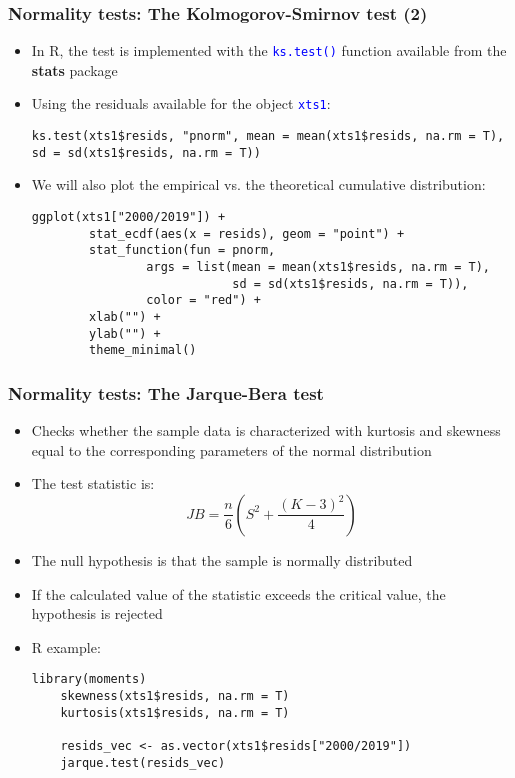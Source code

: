 \documentclass[10pt]{beamer}
\newcommand{\cc}[1]{\texttt{\textcolor{blue}{#1}}}
\theoremstyle{definition}
\begin{document}
\begin{frame}[fragile]
\frametitle{Normality tests: The Kolmogorov-Smirnov test (2)}
\begin{itemize}
	\item In R, the test is implemented with the \cc{ks.test()} function available from the \textbf{stats} package
	\item Using the residuals available for the object \cc{xts1}:
	\begin{lstlisting}[style = rstyle, breaklines]
	ks.test(xts1$resids, "pnorm", mean = mean(xts1$resids, na.rm = T), sd = sd(xts1$resids, na.rm = T))	
	\end{lstlisting}
	\item We will also plot the empirical vs. the theoretical cumulative distribution:
	\begin{lstlisting}[style = rstyle, breaklines]
	ggplot(xts1["2000/2019"]) + 
		stat_ecdf(aes(x = resids), geom = "point") + 
		stat_function(fun = pnorm, 
                args = list(mean = mean(xts1$resids, na.rm = T), 
                            sd = sd(xts1$resids, na.rm = T)), 
                color = "red") + 
		xlab("") + 
		ylab("") +
		theme_minimal()
	\end{lstlisting}
\end{itemize}
\end{frame}

\begin{frame}[fragile]
\frametitle{Normality tests: The Jarque-Bera test}
\begin{itemize}
	\item Checks whether the sample data is characterized with kurtosis and skewness equal to the corresponding parameters of the normal distribution
	\item The test statistic is:
	\[
		JB = \frac{n}{6}\left(S^{2} + \frac{(K-3)^{2}}{4}\right)
	\]
	\item The null hypothesis is that the sample is normally distributed
	\item If the calculated value of the statistic exceeds the critical value, the hypothesis is rejected
	\item R example:
	\begin{lstlisting}[style = rstyle, breaklines]
	library(moments)
	skewness(xts1$resids, na.rm = T)
	kurtosis(xts1$resids, na.rm = T)
	
	resids_vec <- as.vector(xts1$resids["2000/2019"])
	jarque.test(resids_vec)
	\end{lstlisting}
\end{itemize}
\end{frame}
\end{document}
